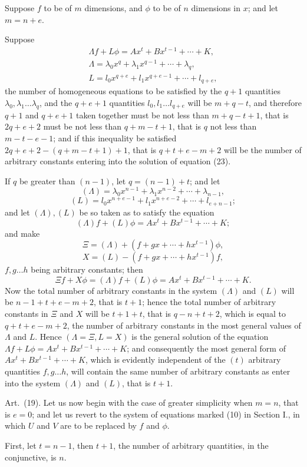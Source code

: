 \documentclass[11pt]{article}
\newcommand{\sourcepage}[1]{\marginpar{\scriptsize p.~#1}}
\newcommand{\art}[1]{\par\smallskip\noindent Art.~(#1).\quad}
\begin{document}
Suppose $f$ to be of $m$ dimensions, and $\phi$ to be of $n$ dimensions in $x$; and let $m=n+e$.

\sourcepage{464}
Suppose
\[
\begin{gathered}
\Lambda f+L\phi=Ax^t+Bx^{t-1}+\cdots+K,\tag{23}\\
\Lambda=\lambda_0x^q+\lambda_1x^{q-1}+\cdots+\lambda_q,\\
L=l_0x^{q+e}+l_1x^{q+e-1}+\cdots+l_{q+e},
\end{gathered}
\]
the number of homogeneous equations to be satisfied by the $q+1$ quantities $\lambda_0,\lambda_1\ldots\lambda_q$, and the $q+e+1$ quantities $l_0,l_1\ldots l_{q+e}$ will be $m+q-t$, and therefore $q+1$ and $q+e+1$ taken together must be not less than $m+q-t+1$, that is $2q+e+2$ must be not less than $q+m-t+1$, that is $q$ not less than $m-t-e-1$; and if this inequality be satisfied $2q+e+2-(q+m-t+1)+1$, that is $q+t+e-m+2$ will be the number of arbitrary constants entering into the solution of equation (23).

If $q$ be greater than $(n-1)$, let $q=(n-1)+t$; and let
\[
(\Lambda)=\lambda_0x^{n-1}+\lambda_1x^{n-2}+\cdots+\lambda_{n-1},
\]
\[
(L)=l_0x^{n+e-1}+l_1x^{n+e-2}+\cdots+l_{e+n-1};
\]
and let $(\Lambda),(L)$ be so taken as to satisfy the equation
\[
(\Lambda)f+(L)\phi=Ax^t+Bx^{t-1}+\cdots+K;
\]
and make
\[
\Xi=(\Lambda)+(f+gx+\cdots+hx^{t-1})\phi,
\]
\[
X=(L)-(f+gx+\cdots+hx^{t-1})f,
\]
$f,g\ldots h$ being arbitrary constants; then
\[
\Xi f+X\phi=(\Lambda)f+(L)\phi=Ax^t+Bx^{t-1}+\cdots+K.
\]
Now the total number of arbitrary constants in the system $(\Lambda)$ and $(L)$ will be $n-1+t+e-m+2$, that is $t+1$; hence the total number of arbitrary constants in $\Xi$ and $X$ will be $t+1+t$, that is $q-n+t+2$, which is equal to $q+t+e-m+2$, the number of arbitrary constants in the most general values of $\Lambda$ and $L$. Hence $(\Lambda=\Xi,L=X)$ is the general solution of the equation $\Lambda f+L\phi=Ax^t+Bx^{t-1}+\cdots+K$; and consequently the most general form of $Ax^t+Bx^{t-1}+\cdots+K$, which is evidently independent of the $(t)$ arbitrary quantities $f,g\ldots h$, will contain the same number of arbitrary constants as enter into the system $(\Lambda)$ and $(L)$, that is $t+1$.

\art{19} Let us now begin with the case of greater simplicity when $m=n$, that is $e=0$; and let us revert to the system of equations marked (10) in Section I., in which $U$ and $V$ are to be replaced by $f$ and $\phi$.

First, let $t=n-1$, then $t+1$, the number of arbitrary quantities, in the conjunctive, is $n$.
\end{document}
